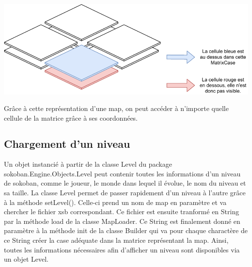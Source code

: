 \documentclass[../main.tex]{subfiles}
\begin{document}
\includegraphics[width=1\textwidth,clip]{images/matrixCase.pdf}

Grâce à cette représentation d'une map, on peut accéder à n'importe quelle cellule de la matrice grâce à ses coordonnées.

\subsection{Chargement d'un niveau}
Un objet instancié à partir de la classe Level du package sokoban.Engine.Objects.Level peut contenir toutes les informations d'un niveau de sokoban,
comme le joueur, le monde dans lequel il évolue, le nom du niveau et sa taille.
La classe Level permet de passer rapidement d'un niveau à l'autre grâce à la méthode setLevel().
Celle-ci prend un nom de map en paramètre et va chercher le fichier xsb correspondant.
Ce fichier est ensuite tranformé en String par la méthode load de la classe MapLoader.
Ce String est finalement donné en paramètre à la méthode init de la classe Builder qui va pour chaque charactère de ce String créer la case adéquate dans la matrice représentant la map.
Ainsi, toutes les informations nécessaires afin d'afficher un niveau sont disponibles via un objet Level.
\end{document}
